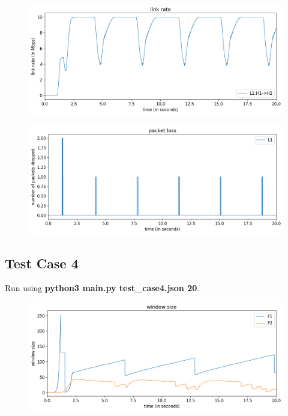 \documentclass{article}
\begin{document}
\begin{figure}[H]
\centering
\includegraphics[width = \textwidth]{"test_case3 link rate"}
\end{figure}

\begin{figure}[H]
\centering
\includegraphics[width = \textwidth]{"test_case3 packet loss"}
\end{figure}


\subsection{Test Case 4}

Run using \textbf{python3 main.py test\_case4.json 20}.

\begin{figure}[H]
\centering
\includegraphics[width = \textwidth]{"test_case4 window size"}
\end{figure}
\end{document}
